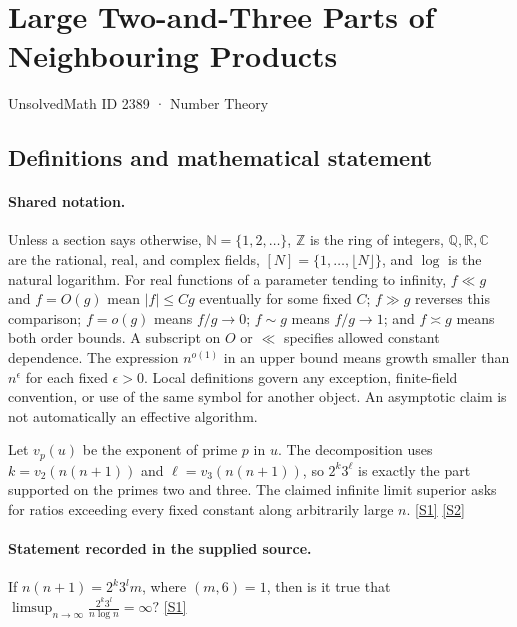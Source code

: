 \documentclass[11pt,a4paper]{article}
\newcommand{\N}{\mathbb{N}}
\newcommand{\Z}{\mathbb{Z}}
\newcommand{\Q}{\mathbb{Q}}
\newcommand{\R}{\mathbb{R}}
\newcommand{\C}{\mathbb{C}}
\newcommand{\sref}[2]{\hyperlink{source:#1:#2}{[S#2]}}
\begin{document}

\setcounter{section}{2388}

\section{Large Two-and-Three Parts of Neighbouring Products}\label{2389}

{\small\sffamily UnsolvedMath ID 2389 · Number Theory}

\subsection{Definitions and mathematical statement}

\paragraph{Shared notation.}Unless a section says otherwise, $\N=\{1,2,\ldots\}$,
$\Z$ is the ring of integers, $\Q,\R,\C$ are the rational, real, and complex
fields, $[N]=\{1,\ldots,\lfloor N\rfloor\}$, and $\log$ is the natural
logarithm. For real functions of a parameter tending to infinity,
$f\ll g$ and $f=O(g)$ mean $|f|\leq Cg$ eventually for some fixed $C$;
$f\gg g$ reverses this comparison; $f=o(g)$ means $f/g\to0$;
$f\sim g$ means $f/g\to1$; and $f\asymp g$ means both order bounds.
A subscript on $O$ or $\ll$ specifies allowed constant dependence.
The expression $n^{o(1)}$ in an upper bound means growth smaller than
$n^\epsilon$ for each fixed $\epsilon>0$. Local definitions govern any
exception, finite-field convention, or use of the same symbol for another
object. An asymptotic claim is not automatically an effective algorithm.



Let $v_p(u)$ be the exponent of prime $p$ in $u$. The decomposition uses $k=v_2(n(n+1))$ and $\ell=v_3(n(n+1))$, so $2^k3^\ell$ is exactly the part supported on the primes two and three. The claimed infinite limit superior asks for ratios exceeding every fixed constant along arbitrarily large $n$. \sref{2389}{1} \sref{2389}{2}

\paragraph{Statement recorded in the supplied source.}
If $n(n+1)=2^k3^lm$, where $(m,6)=1$, then is it true that $ \limsup_{n\to \infty} \frac{2^k3^l}{n\log n}=\infty? $ \sref{2389}{1}
\end{document}
